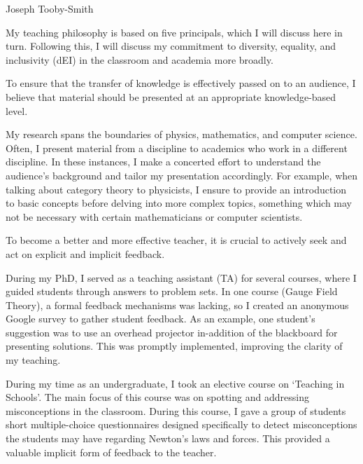 \documentclass[12pt,letter]{article}
\newcounter{customtitle}
\begin{document}
\vspace{-1cm}
\begin{flushright}
{{\Large \color{white}Joseph Tooby-Smith}}
\end{flushright}
\vspace{0.4cm}

My teaching philosophy is based on five principals, which I will discuss here in turn. Following this, I will discuss my commitment to diversity, equality, and inclusivity (dEI) in the classroom and academia more broadly.
 
 
 To ensure that the transfer of knowledge is effectively passed on to an audience, I believe that material should be presented at an appropriate knowledge-based level. 
 
 My research spans the boundaries of physics, mathematics, and computer science. Often, I present material from a discipline to academics who work in a different discipline. In these instances, I make a concerted effort to understand the audience's background and tailor my presentation accordingly. For example, when talking about category theory to physicists, I ensure to provide an introduction to basic concepts before delving into more complex topics, something which may not be necessary with certain mathematicians or computer scientists.


 To become a better and more effective teacher, it is crucial to actively seek and act on explicit and implicit feedback.
 
 During my PhD, I served as a teaching assistant (TA) for several courses, where I guided students through answers to problem sets. In one course (Gauge Field Theory), a formal feedback mechanisms was lacking, so I created an anonymous Google survey to gather student feedback. As an example, one student's suggestion was to use an overhead projector in-addition of the blackboard for presenting solutions.  This was promptly implemented, improving the clarity of my teaching.
 
 During my time as an undergraduate, I took an elective course on `Teaching in Schools'. The main focus of this course was on spotting and addressing misconceptions in the classroom.  
 During this course, I gave a group of students short multiple-choice questionnaires designed specifically to detect misconceptions the students may have regarding Newton's laws and forces. This provided a valuable implicit form of feedback to the teacher. 
 
\end{document}
